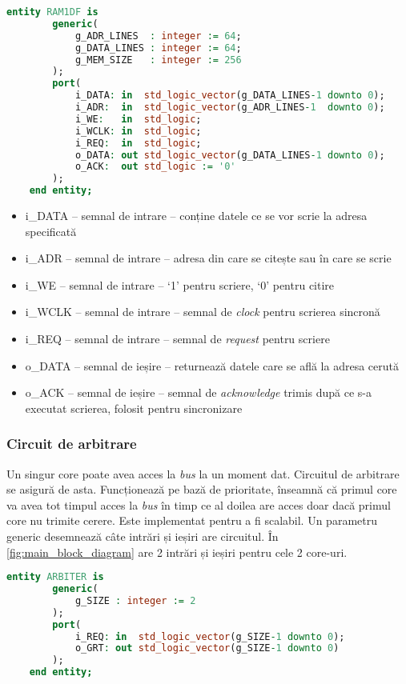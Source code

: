 \documentclass[../main.tex]{subfiles}
\begin{document}
\begin{lstlisting}[language=VHDL, caption={Entitatea memoriei RAM}, label={lst:ram}]
    entity RAM1DF is
        generic(
            g_ADR_LINES  : integer := 64;
            g_DATA_LINES : integer := 64;
            g_MEM_SIZE   : integer := 256
        );
        port(
            i_DATA: in  std_logic_vector(g_DATA_LINES-1 downto 0);
            i_ADR:  in  std_logic_vector(g_ADR_LINES-1  downto 0);
            i_WE:   in  std_logic;
            i_WCLK: in  std_logic;
            i_REQ:  in  std_logic;
            o_DATA: out std_logic_vector(g_DATA_LINES-1 downto 0);
            o_ACK:  out std_logic := '0'
        );
    end entity;
\end{lstlisting}

\begin{itemize}
    \item i\_DATA -- semnal de intrare -- conține datele ce se vor scrie la adresa specificată
    \item i\_ADR -- semnal de intrare -- adresa din care se citește sau în care se scrie
    \item i\_WE -- semnal de intrare -- `1' pentru scriere, `0' pentru citire
    \item i\_WCLK -- semnal de intrare -- semnal de \emph{clock} pentru scrierea sincronă
    \item i\_REQ -- semnal de intrare -- semnal de \emph{request} pentru scriere
    \item o\_DATA -- semnal de ieșire -- returnează datele care se află la adresa cerută
    \item o\_ACK -- semnal de ieșire -- semnal de \emph{acknowledge} trimis după ce s-a executat scrierea, folosit pentru sincronizare
\end{itemize}

\subsubsection{Circuit de arbitrare}
Un singur core poate avea acces la \emph{bus} la un moment dat. Circuitul de arbitrare se asigură de asta. Funcționează pe
bază de prioritate, înseamnă că primul core va avea tot timpul acces la \emph{bus} în timp ce al doilea are acces doar dacă
primul core nu trimite cerere. Este implementat pentru a fi scalabil. Un parametru generic desemnează câte intrări și ieșiri
are circuitul. În \ref{fig:main_block_diagram} are 2 intrări și ieșiri pentru cele 2 core-uri.

\begin{lstlisting}[language=VHDL, caption={Entitatea arbitrului}, label={lst:arbiter}]
    entity ARBITER is
        generic(
            g_SIZE : integer := 2
        );
        port(
            i_REQ: in  std_logic_vector(g_SIZE-1 downto 0);
            o_GRT: out std_logic_vector(g_SIZE-1 downto 0)
        );
    end entity;
\end{lstlisting}
\end{document}
